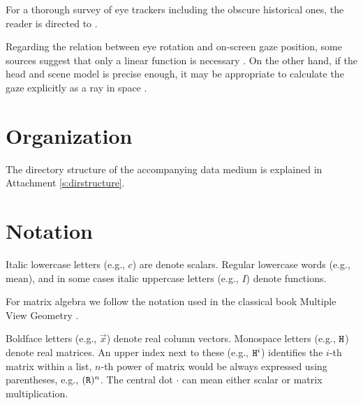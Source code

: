 
For a thorough survey of eye trackers including the obscure historical ones, the reader is directed to \cite{hansen10}.

Regarding the relation between eye rotation and on-screen gaze position, some sources suggest that only a linear function is necessary \cite{zhu12}.
On the other hand, if the head and scene model is precise enough, it may be appropriate to calculate the gaze explicitly as a ray in space \cite{wang16}.

\section{Organization}

The directory structure of the accompanying data medium is explained in Attachment \ref{s:dirstructure}.

\section{Notation}

Italic lowercase letters (e.g., $c$) are denote scalars.
Regular lowercase words (e.g., $\mathrm{mean}$), and in some cases italic uppercase letters (e.g., $I$) denote functions.

For matrix algebra we follow the notation used in the classical book Multiple View Geometry \cite{hartley03}.




\printglossary[type=symbolslist,style=notationlong]   %

\glsaddall

Boldface letters (e.g., $\vec x$) denote real column vectors.
Monospace letters (e.g., $\mathtt{H}$) denote real matrices.
An upper index next to these (e.g., $\mathtt{H}^i$) identifies the $i$-th matrix within a list, $n$-th power of matrix would be always expressed using parentheses, e.g., $(\mathtt{R})^n$.
The central dot $\cdot$ can mean either scalar or matrix multiplication.

